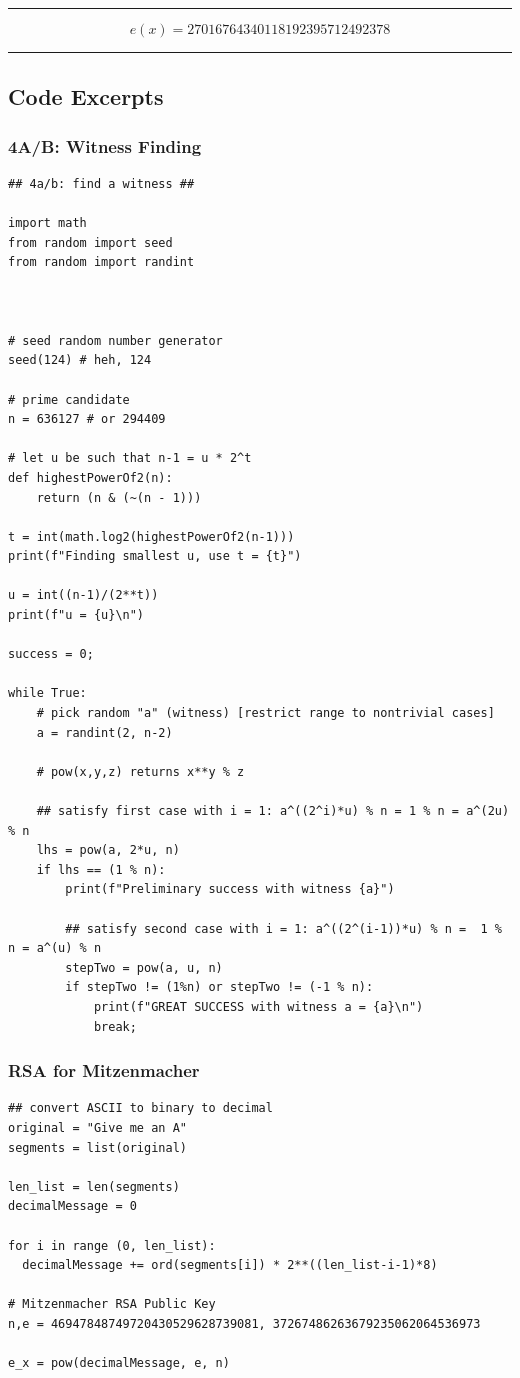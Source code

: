 \documentclass[conference]{styles/acmsiggraph}
\newcommand{\?}{\stackrel{?}{=}}
\begin{document}
\rule{\textwidth}{0.4pt}
$$e(x) = 27016764340118192395712492378$$
\rule{\textwidth}{0.4pt}

\subsection{Code Excerpts}
\subsubsection{4A/B: Witness Finding}
\begin{verbatim}
## 4a/b: find a witness ##

import math
from random import seed
from random import randint



# seed random number generator
seed(124) # heh, 124

# prime candidate
n = 636127 # or 294409

# let u be such that n-1 = u * 2^t
def highestPowerOf2(n):  
    return (n & (~(n - 1))) 

t = int(math.log2(highestPowerOf2(n-1)))
print(f"Finding smallest u, use t = {t}")

u = int((n-1)/(2**t))
print(f"u = {u}\n")

success = 0;

while True:
    # pick random "a" (witness) [restrict range to nontrivial cases]
    a = randint(2, n-2)
    
    # pow(x,y,z) returns x**y % z

    ## satisfy first case with i = 1: a^((2^i)*u) % n = 1 % n = a^(2u) % n
    lhs = pow(a, 2*u, n)
    if lhs == (1 % n):
        print(f"Preliminary success with witness {a}")

        ## satisfy second case with i = 1: a^((2^(i-1))*u) % n =  1 % n = a^(u) % n
        stepTwo = pow(a, u, n)
        if stepTwo != (1%n) or stepTwo != (-1 % n):
            print(f"GREAT SUCCESS with witness a = {a}\n")
            break;
\end{verbatim}

\subsubsection{RSA for Mitzenmacher} \label{CODE: RSA}
\begin{verbatim}
## convert ASCII to binary to decimal
original = "Give me an A"
segments = list(original)

len_list = len(segments)
decimalMessage = 0

for i in range (0, len_list):
  decimalMessage += ord(segments[i]) * 2**((len_list-i-1)*8)

# Mitzenmacher RSA Public Key
n,e = 46947848749720430529628739081, 37267486263679235062064536973

e_x = pow(decimalMessage, e, n)
\end{verbatim}
\end{document}
